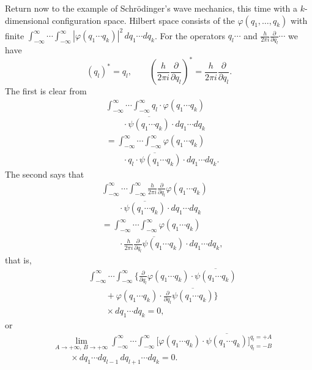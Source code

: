 \documentclass[fontsize=13pt,twoside,openany,headings=normal,parskip=false,bookmarkpackage=false,DIV=calc]{scrbook}
\begin{document}
\hypertarget{origpage-49}{}%
Return now to the example of Schr\"odinger's wave mechanics, this time with a $k$-dimensional configuration space. Hilbert space consists of the $\varphi(q_1,\ldots,q_k)$ with finite $\int_{-\infty}^{\infty}\cdots\int_{-\infty}^{\infty}|\varphi(q_1\cdots q_k)|^2\,dq_1\cdots dq_k$. For the operators $q_l\cdots$ and $\frac{h}{2\pi i}\frac{\partial}{\partial q_l}\cdots$ we have
\[
(q_l)^*=q_l,\qquad
\left(\frac{h}{2\pi i}\frac{\partial}{\partial q_l}\right)^*
=\frac{h}{2\pi i}\frac{\partial}{\partial q_l}.
\]
The first is clear from
\begin{align*}
&\int_{-\infty}^{\infty}\cdots\int_{-\infty}^{\infty}q_l\cdot\varphi(q_1\cdots q_k)\\
&\qquad\cdot\overline{\psi(q_1\cdots q_k)}\cdot dq_1\cdots dq_k\\
&=\int_{-\infty}^{\infty}\cdots\int_{-\infty}^{\infty}\varphi(q_1\cdots q_k)\\
&\qquad\cdot\overline{q_l\cdot\psi(q_1\cdots q_k)}\cdot dq_1\cdots dq_k.
\end{align*}
The second says that
\begin{align*}
&\int_{-\infty}^{\infty}\cdots\int_{-\infty}^{\infty}\frac{h}{2\pi i}\frac{\partial}{\partial q_l}\varphi(q_1\cdots q_k)\\
&\qquad\cdot\overline{\psi(q_1\cdots q_k)}\cdot dq_1\cdots dq_k\\
&=\int_{-\infty}^{\infty}\cdots\int_{-\infty}^{\infty}\varphi(q_1\cdots q_k)\\
&\qquad\cdot\overline{\frac{h}{2\pi i}\frac{\partial}{\partial q_l}\psi(q_1\cdots q_k)}\cdot dq_1\cdots dq_k,
\end{align*}
that is,
\begin{align*}
&\int_{-\infty}^{\infty}\cdots\int_{-\infty}^{\infty}
\biggl\{\frac{\partial}{\partial q_l}\varphi(q_1\cdots q_k)\cdot\overline{\psi(q_1\cdots q_k)}\\
&\qquad+\varphi(q_1\cdots q_k)\cdot\frac{\partial}{\partial q_l}\overline{\psi(q_1\cdots q_k)}\biggr\}\\
&\qquad\times dq_1\cdots dq_k=0,
\end{align*}
or
\begin{align*}
&\lim_{A\to+\infty,\,B\to+\infty}
\int_{-\infty}^{\infty}\cdots\int_{-\infty}^{\infty}
\bigl[\varphi(q_1\cdots q_k)\cdot\overline{\psi(q_1\cdots q_k)}\bigr]_{q_l=-B}^{q_l=+A}\\
&\qquad\times dq_1\cdots dq_{l-1}\,dq_{l+1}\cdots dq_k=0.
\end{align*}
\end{document}
